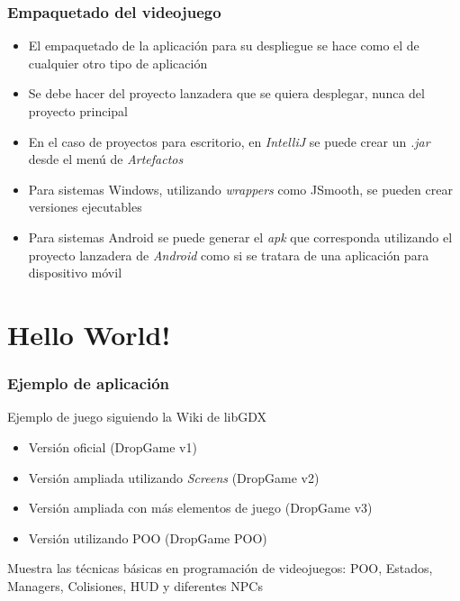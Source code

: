 \documentclass[xcolor={dvipsnames}]{beamer}
\begin{document}
\begin{frame}\frametitle{Empaquetado del videojuego}
    \begin{block}{}
    \begin{itemize}
        \item El empaquetado de la aplicación para su despliegue se hace como el de cualquier otro tipo de aplicación
        \item Se debe hacer del proyecto lanzadera que se quiera desplegar, nunca del proyecto principal
        \item En el caso de proyectos para escritorio, en \emph{IntelliJ} se puede crear un \emph{.jar} desde el menú de \emph{Artefactos}
        \item Para sistemas Windows, utilizando \emph{wrappers} como \textcolor{resalta}{JSmooth}, se pueden crear versiones ejecutables
        \item Para sistemas Android se puede generar el \emph{apk} que corresponda utilizando el proyecto lanzadera de \emph{Android} como si se tratara de una aplicación para dispositivo móvil
    \end{itemize}
    \end{block}
\end{frame}

\section{Hello World!}
\begin{frame}\frametitle{Ejemplo de aplicación}
    \begin{block}{Ejemplo de juego siguiendo la Wiki de \textcolor{resalta}{libGDX}}
    \begin{itemize}
        \item Versión oficial (DropGame v1) \href{https://github.com/codeandcoke/libgdx/DropGame_v1}{}
        \item Versión ampliada utilizando \emph{Screens} (DropGame v2)
        \href{https://github.com/codeandcoke/libgdx/DropGame_v2} {}
        \item Versión ampliada con más elementos de juego (DropGame v3)
        \href{https://github.com/codeandcoke/libgdx/DropGame_v3}{}
        \item Versión utilizando POO (DropGame POO) \href{https://github.com/codeandcoke/libgdx/DropGame_POO}{}
    \end{itemize}
    \end{block}
    Muestra las técnicas básicas en programación de videojuegos: POO, Estados, Managers, Colisiones, HUD y diferentes NPCs
\end{frame}
\end{document}
